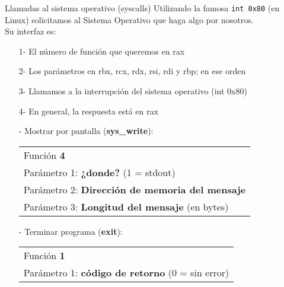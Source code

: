 \documentclass[aspectratio=169]{beamer}
\begin{document}
\begin{frame}[fragile]{Llamadas al sistema operativo (syscalls)}
    \small
    Utilizando la famosa \texttt{int 0x80} (en Linux) solicitamos al Sistema Operativo que haga algo por nosotros.\\
    \vspace{0.2cm}
    \pause
    Su interfaz es:
    \begin{enumerate}
    \item[1-] El número de función que queremos en rax
    \item[2-] Los parámetros en rbx, rcx, rdx, rsi, rdi y rbp; en ese orden
    \item[3-] Llamamos a la interrupción del sistema operativo (int 0x80)
    \item[4-] En general, la respuesta está en rax
    \end{enumerate}
    \pause
    \begin{itemize}
    \item[-] \textcolor{verdeuca}{Mostrar por pantalla} (\textbf{sys\_write}):\\
    \begin{tabular}{l}
    Función \textbf{4}\\
    Parámetro 1: \textbf{¿donde?} (1 = stdout)\\
    Parámetro 2: \textbf{Dirección de memoria del mensaje}\\
    Parámetro 3: \textbf{Longitud del mensaje} (en bytes)\\
    \end{tabular}
    \pause
    \item[-] \textcolor{verdeuca}{Terminar programa} (\textbf{exit}):\\
    \begin{tabular}{l}
    Función \textbf{1}\\
    Parámetro 1: \textbf{código de retorno} (0 = sin error)\\
    \end{tabular}
    \end{itemize}
\end{frame}

\newcommand{\A}[0]{\begin{tikzpicture} \draw[white] (0,0) rectangle (.4,.4); \draw[white] (0,0) rectangle (.3,.3);\end{tikzpicture}}
\newcommand{\T}[0]{\begin{tikzpicture} \draw[white] (0,0) rectangle (.4,.4); \draw[red,fill=red] (0,0) rectangle (.3,.3);\end{tikzpicture}}
\newcommand{\R}[0]{\begin{tikzpicture} \draw[white] (0,0) rectangle (.4,.4); \draw[verdeuca,fill=verdeuca] (0,0) rectangle (.3,.3);\end{tikzpicture}}
\newcommand{\B}[0]{\begin{tikzpicture} \draw[white] (0,0) rectangle (.4,.4); \draw[naranjauca,fill=naranjauca] (0,0) rectangle (.3,.3);\end{tikzpicture}}
\end{document}
